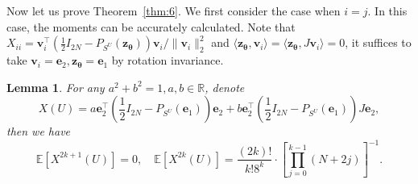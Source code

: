 \documentclass{amsart}
\theoremstyle{plain}
\newtheorem{lemma}{Lemma}
\theoremstyle{definition}
\theoremstyle{remark}
\newcommand{\thmref}[1]{Theorem~\ref{#1}}
\newcommand{\EE}{\mathbb{E}}
\begin{document}
Now let us prove \thmref{thm:6}. We first consider the case when $i=j$. In this case, the moments can be accurately calculated. Note that $X_{ii}=\bm v_i^\top (\frac{1}{2}I_{2N}-P_{S^U}(\bm z_{\bm\theta}))\bm v_i/\|\bm v_i\|_2^2$ and $\langle \bm z_{\bm\theta},\bm v_i\rangle=\langle\bm z_{\bm\theta},J\bm v_i\rangle=0$, it suffices to take $\bm v_i=\bm e_2,\bm z_{\bm\theta}=\bm e_1$ by rotation invariance. 

\begin{lemma}
\label{lem:Q-ineq}
For any $a^2+b^2=1,a,b\in\mathbb R$, denote
\[X(U)=a\bm e_2^\top (\frac{1}{2}I_{2N}-P_{S^U}(\bm e_1))\bm e_2+b\bm e_2^\top (\frac{1}{2}I_{2N}-P_{S^U}(\bm e_1))J\bm e_2,\] then we have
    \begin{equation}
          \EE[X^{2k+1}(U)]=0, \quad \EE[X^{2k}(U)]= \frac{(2k)!}{k!8^k}\cdot\left[\prod_{j=0}^{k-1}(N+2j)\right]^{-1}. 
    \end{equation}

\end{lemma}
\end{document}

